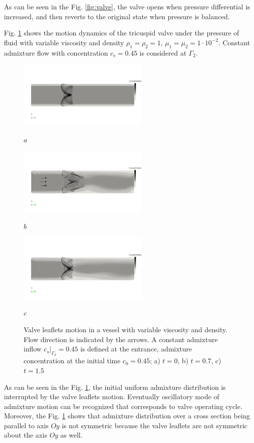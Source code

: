 \documentclass[conference]{IEEEtran}
\begin{document}
As can be seen in the Fig. \ref{fig:valve}, the valve opens when pressure differential is increased,
and then reverts to the original state when pressure is balanced.

Fig. \ref{fig:valve_in_mixture} shows the motion dynamics of the tricuspid valve under the pressure of fluid with variable viscosity and
density $\rho_1 = \rho_2 = 1$, $\mu_1 = \mu_2 = 1 \cdot 10^{-2}$. Constant admixture flow with concentration $c_s = 0.45$ is considered at $\Gamma_2$.

\begin{figure}[!t]
\centering
\includegraphics[width=2.5in]{images/valve_in_mixture_grayscale_new1.png}

$a$

\includegraphics[width=2.5in]{images/valve_in_mixture_grayscale_new2.png}

$b$

\includegraphics[width=2.5in]{images/valve_in_mixture_grayscale_new3.png}

$c$

\caption{Valve leaflets motion in a vessel with variable viscosity and density. Flow direction  is indicated by the
arrows. A constant admixture inflow $c_s|_{\Gamma_2} = 0.45$ is defined at the entrance, admixture concentration at the initial time $c_0 = 0.45$;
a) $t=0$, b) $t=0.7$, c) $t=1.5$}
\label{fig:valve_in_mixture}
\end{figure}

As can be seen in the Fig. \ref{fig:valve_in_mixture}, the initial uniform admixture distribution is interrupted by the valve leaflets motion. Eventually oscillatory mode of
admixture motion can be recognized that corresponds to valve operating cycle. 
Moreover, the Fig. \ref{fig:valve_in_mixture} shows that admixture distribution over a cross section being parallel to axis $Oy$
is not symmetric because the valve leaflets are not symmetric about the axis $Oy$ as well.
\end{document}
